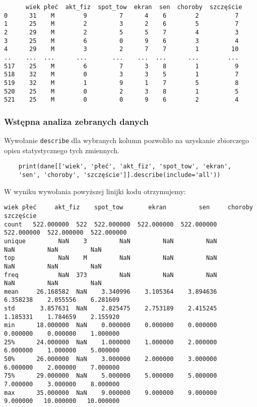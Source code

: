 \documentclass[12pt,a4paper]{article}
\begin{document}
\begin{lstlisting}
      wiek płeć  akt_fiz  spot_tow  ekran  sen  choroby  szczęście
0      31    M        9         7      4    6        2          7
1      25    M        2         3      2    6        5          7
2      29    M        2         5      5    7        4          3
3      25    M        6         0      9    6        3          4
4      29    M        3         2      7    7        1         10
..    ...  ...      ...       ...    ...  ...      ...        ...
517    25    M        6         7      3    8        1          9
518    32    M        0         3      3    5        1          7
519    32    M        1         9      1    7        5          8
520    25    M        0         2      3    8        1          5
521    25    M        0         0      9    6        2          4
\end{lstlisting}

\subsubsection{Wstępna analiza zebranych danych}

Wywołanie \texttt{describe} dla wybranych kolumn pozwoliło na uzyskanie zbiorczego opisu statystycznego tych zmiennych. 
\begin{lstlisting}
    print(dane[['wiek', 'płeć', 'akt_fiz', 'spot_tow', 'ekran', 
    'sen', 'choroby', 'szczęście']].describe(include='all'))
\end{lstlisting}
W wyniku wywołania powyższej linijki kodu otrzymujemy:
\begin{lstlisting}[basicstyle=\ttfamily\fontsize{7}{8}\selectfont\color{black},
  keywordstyle=\color{black},
  commentstyle=\color{black},
  stringstyle=\color{black},
  frame=single]
              wiek płeć     akt_fiz    spot_tow       ekran         sen     choroby   szczęście
count   522.000000  522  522.000000  522.000000  522.000000  522.000000  522.000000  522.000000
unique         NaN    3         NaN         NaN         NaN         NaN         NaN         NaN
top            NaN    M         NaN         NaN         NaN         NaN         NaN         NaN
freq           NaN  373         NaN         NaN         NaN         NaN         NaN         NaN
mean     26.168582  NaN    3.340996    3.105364    3.894636    6.358238    2.055556    6.281609
std       3.857631  NaN    2.825475    2.753189    2.415245    1.185331    1.784659    2.155920
min      18.000000  NaN    0.000000    0.000000    0.000000    0.000000    0.000000    1.000000
25%      24.000000  NaN    1.000000    1.000000    2.000000    6.000000    1.000000    5.000000
50%      26.000000  NaN    3.000000    2.000000    3.000000    6.000000    2.000000    7.000000
75%      29.000000  NaN    5.000000    5.000000    5.000000    7.000000    3.000000    8.000000
max      35.000000  NaN    9.000000    9.000000    9.000000    9.000000   10.000000   10.000000
\end{lstlisting}
\end{document}
